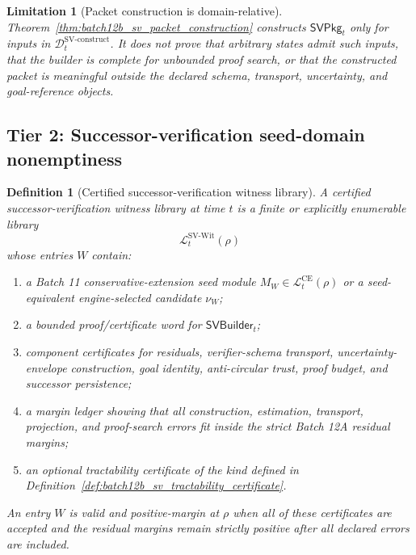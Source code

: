 \documentclass[11pt]{article}
\newtheorem{definition}[theorem]{Definition}
\newtheorem{limitation}[theorem]{Limitation}
\newcommand{\Lcal}{\mathcal{L}}
\newcommand{\1}{\mathbf{1}}
\providecommand{\Dcal}{\mathcal{D}}
\begin{document}
\begin{limitation}[Packet construction is domain-relative]
\label{lim:batch12b_packet_construction_domain_relative}
Theorem~\ref{thm:batch12b_sv_packet_construction} constructs \(\mathsf{SVPkg}_t\) only for inputs in \(\Dcal_t^{\mathrm{SV\mbox{-}construct}}\).  It does not prove that arbitrary states admit such inputs, that the builder is complete for unbounded proof search, or that the constructed packet is meaningful outside the declared schema, transport, uncertainty, and goal-reference objects.
\end{limitation}

\subsection{Tier 2: Successor-verification seed-domain nonemptiness}

\begin{definition}[Certified successor-verification witness library]
\label{def:batch12b_sv_witness_library}
A certified successor-verification witness library at time \(t\) is a finite or explicitly enumerable library
\[
\Lcal_t^{\mathrm{SV\mbox{-}Wit}}(\rho)
\]
whose entries \(W\) contain:
\begin{enumerate}[label=(\roman*),leftmargin=1.5em]
    \item a Batch 11 conservative-extension seed module \(M_W\in\Lcal_t^{\mathrm{CE}}(\rho)\) or a seed-equivalent engine-selected candidate \(\nu_W\);
    \item a bounded proof/certificate word for \(\mathsf{SVBuilder}_t\);
    \item component certificates for residuals, verifier-schema transport, uncertainty-envelope construction, goal identity, anti-circular trust, proof budget, and successor persistence;
    \item a margin ledger showing that all construction, estimation, transport, projection, and proof-search errors fit inside the strict Batch 12A residual margins;
    \item an optional tractability certificate of the kind defined in Definition~\ref{def:batch12b_sv_tractability_certificate}.
\end{enumerate}
An entry \(W\) is \emph{valid and positive-margin} at \(\rho\) when all of these certificates are accepted and the residual margins remain strictly positive after all declared errors are included.
\end{definition}
\end{document}
